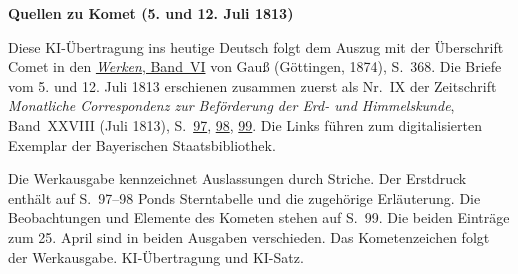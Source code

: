 \clearpage\thispagestyle{empty}
\begin{center}\textbf{Quellen zu Komet (5. und 12. Juli 1813)}\end{center}
\noindent Diese KI-Übertragung ins heutige Deutsch folgt dem Auszug mit der Überschrift Comet in den \href{https://gdz.sub.uni-goettingen.de/id/PPN236007467}{\textit{Werken}, Band~VI} von Gauß (Göttingen, 1874), S.~368. Die Briefe vom 5. und 12. Juli 1813 erschienen zusammen zuerst als Nr.~IX der Zeitschrift \textit{Monatliche Correspondenz zur Beförderung der Erd- und Himmelskunde}, Band~XXVIII (Juli 1813), S.~\href{https://api.digitale-sammlungen.de/iiif/image/v2/bsb10538617_00103/full/1600,/0/default.jpg}{97}, \href{https://api.digitale-sammlungen.de/iiif/image/v2/bsb10538617_00104/full/1600,/0/default.jpg}{98}, \href{https://api.digitale-sammlungen.de/iiif/image/v2/bsb10538617_00105/full/1600,/0/default.jpg}{99}. Die Links führen zum digitalisierten Exemplar der Bayerischen Staatsbibliothek.
\par\smallskip\noindent Die Werkausgabe kennzeichnet Auslassungen durch Striche. Der Erstdruck enthält auf S.~97--98 Ponds Sterntabelle und die zugehörige Erläuterung. Die Beobachtungen und Elemente des Kometen stehen auf S.~99. Die beiden Einträge zum 25. April sind in beiden Ausgaben verschieden. Das Kometenzeichen folgt der Werkausgabe. KI-Übertragung und KI-Satz.
\clearpage
